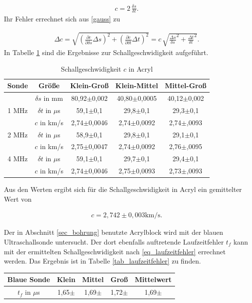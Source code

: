 \begin{align}
 c = 2\, \frac{\delta s}{\delta t}.
\end{align}
Ihr Fehler errechnet sich aus \eqref{gauss} zu

\begin{align}
 \Delta c = \sqrt{\left(\frac{\partial c}{\partial \delta s} \Delta s \right)^2 + \left(\frac{\partial c}{\partial \delta t} \Delta t \right)^2} = c\, \sqrt{\frac{\Delta s}{\delta s}^2 + \frac{\Delta t}{\delta t}^2}.
\end{align}
In Tabelle \ref{tab_schall} sind die Ergebnisse zur Schallgeschwidigkeit aufgeführt. 
\renewcommand{\arraystretch}{1.5}
\begin{table}[H]
 \begin{tabular}{c|c|c|c|c}
Sonde & Größe & Klein-Groß & Klein-Mittel & Mittel-Groß\\
\hline
&$\delta s$ in mm	&	80,92$\pm$0,002&	40,80$\pm$0,0005&	40,12$\pm$0,002\\
\hline
\hline
1 MHz &$\delta t$ in $\mu$s &59,1$\pm$0,1&	29,8$\pm$0,1&	29,3$\pm$0,1\\
&$c$ in km/s		&2,74$\pm$0,0046&	2,74$\pm$0,0092	&	2,74$\pm$,0093\\
\hline
2 MHz &$\delta t$ in $\mu$s &	58,9$\pm$0,1&	29,8$\pm$0,1&	29,1$\pm$0,1\\
&$c$ in km/s		&2,75$\pm$0,0047&	2,74$\pm$0,0092	&	2,76$\pm$,0095\\
\hline
4 MHz &$\delta t$ in $\mu$s &	59,1$\pm$0,1&	29,7$\pm$0,1&	29,4$\pm$0,1\\
&$c$ in km/s		&2,74$\pm$0,0046&	2,75$\pm$0,0093&	2,73$\pm$,0093\\
 \end{tabular}
\caption{Schallgeschwidigkeit $c$ in Acryl}
\label{tab_schall}
\end{table}
\renewcommand{\arraystretch}{1.0}
Aus den Werten ergibt sich für die Schallgeschwidigkeit in Acryl ein gemittelter Wert von

\begin{align}
 c = 2,742\pm0,003 \text{km/s}.
\end{align}

Der in Abschnitt \ref{sec_bohrung} benutzte Acrylblock wird mit der blauen Ultraschallsonde untersucht. Der dort ebenfalls auftretende
Laufzeitfehler $t_f$ kann mit der ermittelten Schallgeschwidigkeit nach \eqref{eq_laufzeitfehler} errechnet werden. Das Ergebnis
ist in Tabelle \ref{tab_laufzeitfehler} zu finden.

\begin{table}[H]
 \begin{tabular}{c|c|c|c|c}
Blaue Sonde & Klein & Mittel & Groß & Mittelwert\\
 \hline
  $t_f$ in $\mu$s &1,65$\pm$	&1,69$\pm$	&1,72$\pm$ & 1,69$\pm$ \\
 \end{tabular}

\end{table}



